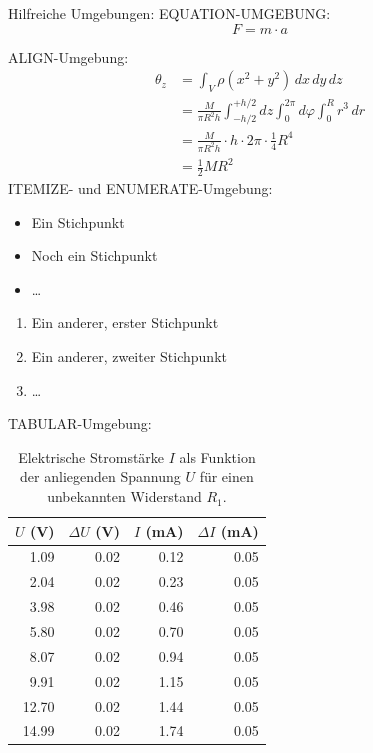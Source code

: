 \documentclass[12pt, a4paper, DIV=12, BCOR=1cm]{scrartcl}
\begin{document}
Hilfreiche Umgebungen:
EQUATION-UMGEBUNG:
\begin{equation}
	F = m \cdot a
	\label{Fma}
\end{equation}

ALIGN-Umgebung:
\begin{align}
	\theta_z &= \int_V \rho (x^2 + y^2)\,dx\,dy\,dz \\
	&=\frac{M}{\pi R^2 h} \int_{-h/2}^{+h/2}{dz} \int_{0}^{2\pi}{d\varphi} \int_{0}^{R}{r^3\,dr} \\
	&= \frac{M}{\pi R^2 h} \cdot h \cdot 2\pi \cdot \frac{1}{4} R^4 \\
	&= \frac{1}{2}MR^2
\end{align}
%
ITEMIZE- und ENUMERATE-Umgebung:
\begin{itemize}
	\item Ein Stichpunkt
	\item Noch ein Stichpunkt
	\item \ldots
\end{itemize}


\begin{enumerate}
	\item Ein anderer, erster Stichpunkt
	\item Ein anderer, zweiter Stichpunkt
	\item \ldots
\end{enumerate}

TABULAR-Umgebung:
\begin{table}[h!]
	\centering
	\begin{tabular}{|r|r|r|r|}
		\hline
		$U$ (V) & $\Delta U$ (V) & $I$ (mA) & $\Delta I$ (mA) \\
		\hline
		1.09 & 0.02 & 0.12 & 0.05 \\
		2.04 & 0.02 & 0.23 & 0.05 \\
		3.98 & 0.02 & 0.46 & 0.05 \\
		5.80 & 0.02 & 0.70 & 0.05 \\
		8.07 & 0.02 & 0.94 & 0.05 \\
		9.91 & 0.02 & 1.15 & 0.05 \\
		12.70 & 0.02 & 1.44 & 0.05 \\
		14.99 & 0.02 & 1.74 & 0.05 \\
		\hline
	\end{tabular}
	\caption{Elektrische Stromstärke $I$ als Funktion der anliegenden Spannung $U$ für einen unbekannten Widerstand $R_1$.}
	\label{tab:daten1}
\end{table}
\end{document}
